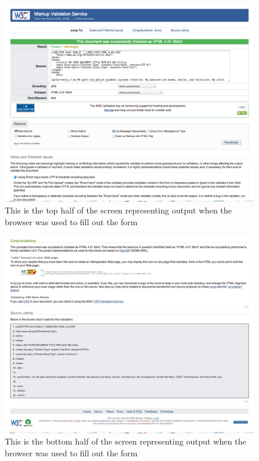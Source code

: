 \documentclass{article}
\begin{document}
\begin{figure}
\includegraphics[scale=0.30]{w3cMarkupValidationServiceNormal01}
\caption{This is the top half of the screen representing output when the browser was used to fill out the form}
\end{figure}

\begin{figure}
\includegraphics[scale=0.30]{w3cMarkupValidationServiceNormal02}
\caption{This is the bottom half of the screen representing output when the browser was used to fill out the form}
\end{figure}
\end{document}
